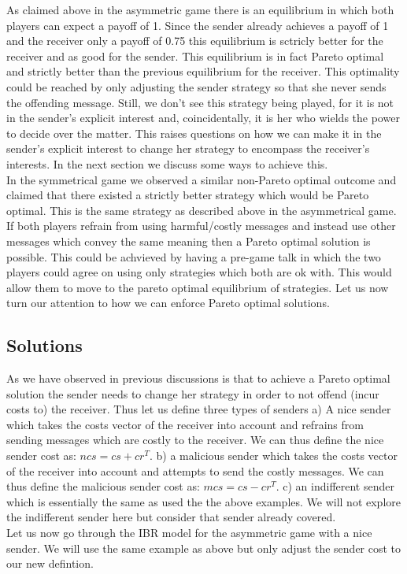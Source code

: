 \documentclass{article}
\begin{document}
As claimed above in the asymmetric game there is an equilibrium in which both players can expect a payoff of 1. Since the sender already achieves a payoff of 1 and the receiver only a payoff of 0.75 this equilibrium is sctricly better for the receiver and as good for the sender. This equilibrium is in fact Pareto optimal and strictly better than the previous equilibrium for the receiver. This optimality could be reached by only adjusting the sender strategy so that she never sends the offending message. Still, we don't see this strategy being played, for it is not in the sender's explicit interest and, coincidentally, it is her who wields the power to decide over the matter. This raises questions on how we can make it in the sender's explicit interest to change her strategy to encompass the receiver's interests. In the next section we discuss some ways to achieve this.\\
In the symmetrical game we observed a similar non-Pareto optimal outcome and claimed that there existed a strictly better strategy which would be Pareto optimal. This is the same strategy as described above in the asymmetrical game. If both players refrain from using harmful/costly messages and instead use other messages which convey the same meaning then a Pareto optimal solution is possible. This could be achvieved by having a pre-game talk in which the two players could agree on using only strategies which both are ok with. This would allow them to move to the pareto optimal equilibrium of strategies. Let us now turn our attention to how we can enforce Pareto optimal solutions.

\subsection{Solutions}
As we have observed in previous discussions is that to achieve a Pareto optimal solution the sender needs to change her strategy in order to not offend (incur costs to) the receiver. Thus let us define three types of senders a) A nice sender which takes the costs vector of the receiver into account and refrains from sending messages which are costly to the receiver. We can thus define the nice sender cost as: $ncs=cs + cr^T$. b) a malicious sender which takes the costs vector of the receiver into account and attempts to send the costly messages. We can thus define the malicious sender cost as: $mcs=cs - cr^T$. c) an indifferent sender which is essentially the same as used the the above examples. We will not explore the indifferent sender here but consider that sender already covered. \\
Let us now go through the IBR model for the asymmetric game with a nice sender. We will use the same example as above but only adjust the sender cost to our new defintion.
\end{document}
